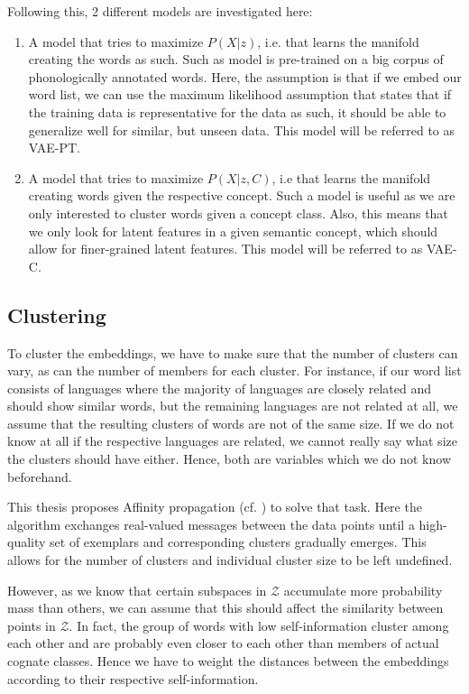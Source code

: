 \documentclass[6pt]{article}
\begin{document}
{Following this, 2 different models are investigated here:
\begin{enumerate}
\item A model that tries to maximize $P(X|z)$, i.e. that learns the manifold creating the words as such. Such as model is pre-trained on a big corpus of phonologically annotated words. Here, the assumption is that if we embed our word list, we can use the maximum likelihood assumption that states that if the training data is representative for the data as such, it should be able to generalize well for similar, but unseen data. This model will be referred to as VAE-PT.
\item A model that tries to maximize $P(X|z,C)$, i.e that learns the manifold creating words given the respective concept. Such a model is useful as we are only interested to cluster words given a concept class. Also, this means that we only look for latent features in a given semantic concept, which should allow for finer-grained latent features. This model will be referred to as VAE-C.
\end{enumerate}

\subsection{Clustering}

To cluster the embeddings, we have to make sure that the number of clusters can vary, as can the number of members for each cluster. For instance, if our word list consists of languages where the majority of languages are closely related and should show similar words, but the remaining languages are not related at all, we assume that the resulting clusters of words are not of the same size. If we do not know at all if the respective languages are related, we cannot really say what size the clusters should have either. Hence, both are variables which we do not know beforehand. 

This thesis proposes Affinity propagation (cf. \cite{frey2007clustering}) to solve that task. Here the algorithm exchanges real-valued messages between the data points until a high-quality set of exemplars and corresponding clusters
gradually emerges. This allows for the number of clusters and individual cluster size to be left undefined.

However, as we know that  certain subspaces in $\mathcal{Z}$ accumulate more probability mass than others, we can assume that this should affect the similarity between points in $\mathcal{Z}$. In fact, the group of words with low self-information cluster among each other and are probably even closer to each other than members of actual cognate classes. Hence we have to weight the distances between the embeddings according to their respective self-information.

}
\end{document}
